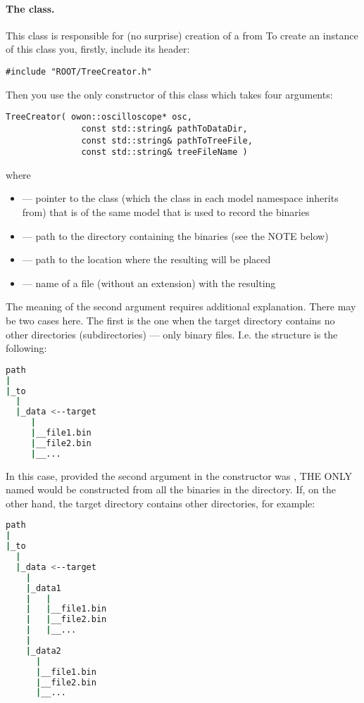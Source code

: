 \paragraph*{The  class.} This class is responsible for (no surprise) 
creation of a  from 
To create an instance of this class you, firstly, include its header:
\begin{lstlisting}
#include "ROOT/TreeCreator.h"
\end{lstlisting}
Then you use the only constructor of this class which takes four arguments:
\begin{lstlisting}
TreeCreator( owon::oscilloscope* osc,
               const std::string& pathToDataDir,
               const std::string& pathToTreeFile,
               const std::string& treeFileName )
\end{lstlisting}
where
    \begin{itemize}
        \item[]  --- pointer to the  class (which the  class in each model namespace inherits from) that is of the same model that is
            used to record the binaries
        \item[]  --- path to the directory containing the binaries (see the NOTE below)
        \item[]  --- path to the location where the resulting  will be placed
        \item[]  --- name of a  file (without an extension) with the resulting 
    \end{itemize}
The meaning of the second argument requires additional explanation. There may be two
cases here. The first is the one when the target directory contains no other directories
(subdirectories) --- only binary files. I.e. the structure is the following:
\begin{lstlisting}[language=bash]
path
|
|_to
  |
  |_data <--target
     |
     |__file1.bin
     |__file2.bin
     |__...
\end{lstlisting}
In this case, provided the second argument in the  constructor
was , THE ONLY  named  would be constructed
from all the binaries in the  directory. If, on the other hand, the target
directory contains other directories, for example:
\begin{lstlisting}[language=bash]
path
|
|_to
  |
  |_data <--target
    |
    |_data1
    |   | 
    |   |__file1.bin
    |   |__file2.bin
    |   |__...
    |
    |_data2
      |
      |__file1.bin
      |__file2.bin
      |__...
\end{lstlisting}
